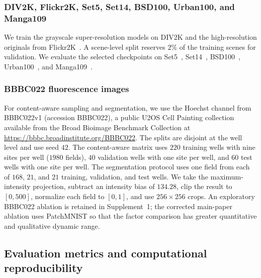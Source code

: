 \documentclass{optica-article}
\begin{document}
\subsubsection{DIV2K, Flickr2K, Set5, Set14, BSD100, Urban100, and Manga109}
We train the grayscale super-resolution models on DIV2K and the high-resolution originals from Flickr2K~\cite{agustsson2017ntire}. A scene-level split reserves $2\%$ of the training scenes for validation. We evaluate the selected checkpoints on Set5~\cite{bevilacqua2012low}, Set14~\cite{zeyde2010single}, BSD100~\cite{martin2001database}, Urban100~\cite{huang2015single}, and Manga109~\cite{matsui2017sketch}.

\subsubsection{BBBC022 fluorescence images}
For content-aware sampling and segmentation, we use the Hoechst channel from BBBC022v1 (accession BBBC022), a public U2OS Cell Painting collection~\cite{gustafsdottir2013multiplex,ljosa2012annotated} available from the Broad Bioimage Benchmark Collection at \url{https://bbbc.broadinstitute.org/BBBC022}. The splits are disjoint at the well level and use seed $42$. The content-aware matrix uses $220$ training wells with nine sites per well ($1980$ fields), $40$ validation wells with one site per well, and $60$ test wells with one site per well. The segmentation protocol uses one field from each of $168$, $21$, and $21$ training, validation, and test wells. We take the maximum-intensity projection, subtract an intensity bias of $134.28$, clip the result to $[0,500]$, normalize each field to $[0,1]$, and use $256\times256$ crops. An exploratory BBBC022 ablation is retained in Supplement~1; the corrected main-paper ablation uses PatchMNIST so that the factor comparison has greater quantitative and qualitative dynamic range.


\subsection{Evaluation metrics and computational reproducibility}
\label{sec:reproducibility}
\end{document}
